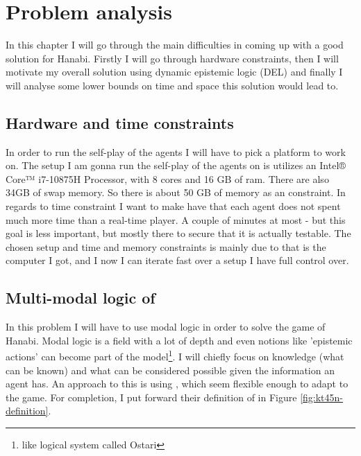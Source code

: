 \section{Problem analysis}

In this chapter I will go through the main difficulties in coming up with a good solution for Hanabi. Firstly I will go through hardware constraints, then I will motivate my overall solution using dynamic epistemic logic (DEL) and finally I will analyse some lower bounds on time and space this solution would lead to.

\subsection{Hardware and time constraints}
In order to run the self-play of the agents I will have to pick a platform to work on.
The setup I am gonna run the self-play of the agents on is utilizes an Intel® Core™ i7-10875H Processor, with 8 cores and 16 GB of ram. There are also 34GB of swap memory. So there is about 50 GB of memory as an constraint.
In regards to time constraint I want to make have that each agent does not spent much more time than a real-time player. A couple of minutes at most - but this goal is less important, but mostly there to secure that it is actually testable.
The chosen setup and time and memory constraints is mainly due to that is the computer I got, and I now I can iterate fast over a setup I have full control over.

\subsection{Multi-modal logic of \KTfourfiveN} \label{sec:definition-ktfourfiven}
In this problem I will have to use modal logic in order to solve the game of Hanabi. Modal logic is a field with a lot of depth and even notions like 'epistemic actions' can become part of the model\footnote{like \cite{EgerAndMartens17} logical system called Ostari}. I will chiefly focus on knowledge (what can be known) and what can be considered possible given the information an agent has. An approach to this is using \KTfourfiveN \cite{HuthAndRyan2004KT45n}, which seem flexible enough to adapt to the game. For completion, I put forward their definition of \KTfourfiveN in Figure \ref{fig:kt45n-definition}. 

